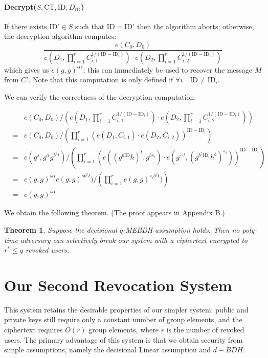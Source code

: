 \documentclass[a4paper, 11pt]{article}
\newtheorem{theorem}{Theorem}
\newtheorem{theorem}{Theorem}[section]
\theoremstyle{definition}
\newcommand{\ID}{\ensuremath{\textrm{ID}}}
\newcommand{\CT}{\ensuremath{\textrm{CT}}}
\begin{document}
\paragraph{Decrypt($S,\CT,\ID,D_{\ID}$)}
If there exists $\ID' \in S$ such that $\ID = \ID'$ then the algorithm aborts; otherwise,
the decryption algorithm computes:
\[
\frac{e(C_0,D_0)}
{
e\left(D_1, \prod_{i=1}^{r}C_{i,1}^{1/(\ID-\ID_i)}\right)
\cdot
e\left(D_2, \prod_{i=1}^{r}C_{i,2}^{1/(\ID-\ID_i)}\right)
}
\]
which gives us $e(g,g)^{\alpha s}$; this can immediately be used to recover the message $M$ from $C'$.
Note that this computation is only defined
if $\forall i \quad \ID \neq \ID_i$.

We can verify the correctness of the decryption computation.

\begin{eqnarray*}
& &
e(C_0,D_0)/ \left(
e\left(D_1, \prod_{i=1}^{r}C_{i,1}^{1/(\ID-\ID_i)}\right)
\cdot
e\left(D_2, \prod_{i=1}^{r}C_{i,2}^{1/(\ID-\ID_i)}\right)
\right)\\
&=&
e(C_0,D_0)/ \left(
\prod_{i=1}^{r}
\left(
   e\left(D_1, C_{i,1}\right)
  \cdot
    e\left(D_2, C_{i,2}\right)
\right)^{\ID-\ID_i}
\right)\\
&=&
e(g^s,g^{\alpha}g^{b^2 t})/ \left(
\prod_{i=1}^{r}
\left(
   e\left( (g^{b \ID}h)^t, g^{b s_i}\right)
  \cdot
    e\left(g^{-t}, (g^{b^2\ID_i }h^b )^{s_i}\right)
\right)^{\ID-\ID_i}
\right)\\
&=&
e(g,g)^{s \alpha} e(g,g)^{s b^2 t})/ \left(
\prod_{i=1}^{r}
  e(g,g)^{s_i b^2 t})
\right)\\
&=&
e(g,g)^{s \alpha}
\end{eqnarray*}

We obtain the following theorem. (The proof appears in Appendix B.)

\begin{theorem}
Suppose the decisional $q$-MEBDH assumption holds. Then no poly-time adversary
can selectively break our system with a ciphertext encrypted to $r^* \leq q$
revoked users.
\end{theorem}


\section{Our Second Revocation System}
\label{sec:newconstruction}
This system retains the desirable properties of our simpler system: public and private keys still require only a constant number of group elements, and the ciphertext requires $O(r)$ group elements, where $r$ is the number of revoked users. The primary advantage of this system is that we obtain security from simple assumptions, namely the decisional Linear assumption and $d-BDH$.
\end{document}
